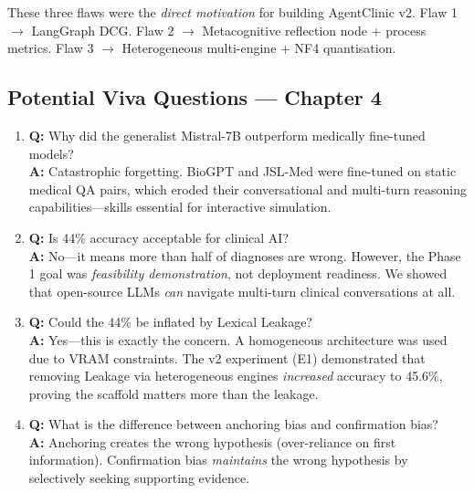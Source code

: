 \begin{mattersbox}[\textcolor{white}{Why It Matters for This Thesis}]
These three flaws were the \textit{direct motivation} for building AgentClinic v2. Flaw 1 $\rightarrow$ LangGraph DCG. Flaw 2 $\rightarrow$ Metacognitive reflection node + process metrics. Flaw 3 $\rightarrow$ Heterogeneous multi-engine + NF4 quantisation.
\end{mattersbox}

\subsection{Potential Viva Questions --- Chapter 4}

\begin{vivabox}[\textcolor{white}{Likely Viva Questions}]
\begin{enumerate}
    \item \textbf{Q:} Why did the generalist Mistral-7B outperform medically fine-tuned models?\\
    \textbf{A:} Catastrophic forgetting. BioGPT and JSL-Med were fine-tuned on static medical QA pairs, which eroded their conversational and multi-turn reasoning capabilities---skills essential for interactive simulation.

    \item \textbf{Q:} Is 44\% accuracy acceptable for clinical AI?\\
    \textbf{A:} No---it means more than half of diagnoses are wrong. However, the Phase 1 goal was \textit{feasibility demonstration}, not deployment readiness. We showed that open-source LLMs \textit{can} navigate multi-turn clinical conversations at all.

    \item \textbf{Q:} Could the 44\% be inflated by Lexical Leakage?\\
    \textbf{A:} Yes---this is exactly the concern. A homogeneous architecture was used due to VRAM constraints. The v2 experiment (E1) demonstrated that removing Leakage via heterogeneous engines \textit{increased} accuracy to 45.6\%, proving the scaffold matters more than the leakage.

    \item \textbf{Q:} What is the difference between anchoring bias and confirmation bias?\\
    \textbf{A:} Anchoring creates the wrong hypothesis (over-reliance on first information). Confirmation bias \textit{maintains} the wrong hypothesis by selectively seeking supporting evidence.


\end{enumerate}
\end{vivabox}
